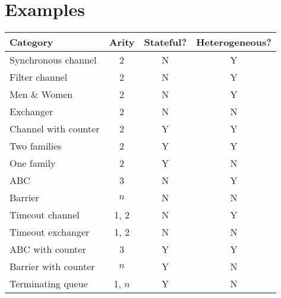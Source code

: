 \section{Examples}

\begin{center}
\begin{tabular}{lccc}
Category            & Arity & Stateful? & Heterogeneous? \\ \hline
Synchronous channel & 2     & N         & Y \\
Filter channel      & 2     & N         & Y \\
Men \& Women        & 2     & N         & Y \\
Exchanger           & 2     & N         & N \\
Channel with counter & 2    & Y         & Y \\
Two families        & 2     & Y         & Y \\
One family          & 2     & Y         & N \\
ABC                 & 3     & N         & Y \\
Barrier             & $n$   & N         & N \\
Timeout channel     & 1, 2  & N         & Y \\
Timeout exchanger   & 1, 2  & N         & N \\
ABC with counter    & 3     & Y         & Y \\
Barrier with counter & $n$  & Y         & N \\
Terminating queue   & 1, $n$ & Y        & N         
\end{tabular}
\end{center}
